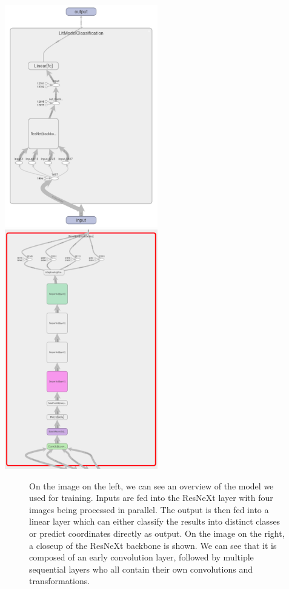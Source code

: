 \documentclass[]{article}
\begin{document}
\includegraphics[width=0.5\textwidth,height=\textheight]{./tex2pdf.-3ffa51a14b505aec/3b720008a76e1b2463616b1e73b4a49185b86f70.png}
\includegraphics[width=0.5\textwidth,height=\textheight]{./tex2pdf.-3ffa51a14b505aec/c69f30929fb108f94045fbce0672b65185a7f3c7.png}

\begin{figure}[!h]
\caption{On the image on the left, we can see an overview of the model we used for training. Inputs are fed into the ResNeXt layer with four images being processed in parallel. The output is then fed into a linear layer which can either classify the results into distinct classes or predict coordinates directly as output. On the image on the right, a closeup of the ResNeXt backbone is shown. We can see that it is composed of an early convolution layer, followed by multiple sequential layers who all contain their own convolutions and transformations.}
\end{figure}
\end{document}
